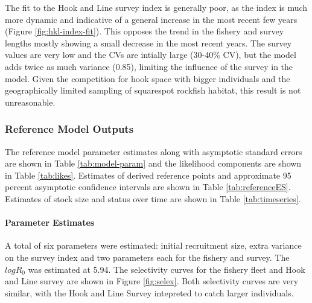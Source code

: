 \documentclass[11pt,
  english,
  a4paper,
]{article}
\begin{document}
The fit to the Hook and Line survey index is generally poor, as the index is much more dynamic and indicative of a general increase in the most recent few years (Figure \ref{fig:hkl-index-fit}). This opposes the trend in the fishery and survey lengths mostly showing a small decrease in the most recent years. The survey values are very low and the CVs are intially large (30-40\% CV), but the model adds twice as much variance (0.85), limiting the influence of the survey in the model. Given the competition for hook space with bigger individuals and the geographically limited sampling of squarespot rockfish habitat, this result is not unreasonable.

\leavevmode\tagmcend\tagstructend\par


\hypertarget{reference-model-outputs}{%
\subsubsection{Reference Model Outputs}\label{reference-model-outputs}}

\leavevmode\tagmcend\tagstructend


The reference model parameter estimates along with asymptotic standard errors are shown in Table \ref{tab:model-param} and the likelihood components are shown in Table \ref{tab:likes}. Estimates of derived reference points and approximate 95 percent asymptotic confidence intervals are shown in Table \ref{tab:referenceES}. Estimates of stock size and status over time are shown in Table \ref{tab:timeseries}.

\leavevmode\tagmcend\tagstructend\par


\hypertarget{parameter-estimates}{%
\paragraph{Parameter Estimates}\label{parameter-estimates}}

\leavevmode\tagmcend\tagstructend


A total of six parameters were estimated: initial recruitment size, extra variance on the survey index and two parameters each for the fishery and survey. The {\(logR_0\)\leavevmode\tagmcend\tagstructend} was estimated at 5.94. The selectivity curves for the fishery fleet and Hook and Line survey are shown in Figure \ref{fig:selex}. Both selectivity curves are very similar, with the Hook and Line Survey intepreted to catch larger individuals.
\end{document}
